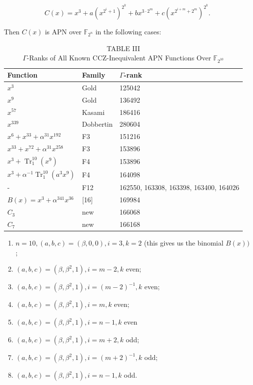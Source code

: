 \documentclass[10pt]{article}
\begin{document}
$$
C(x)=x^{3}+a\left(x^{2^{i}+1}\right)^{2^{k}}+b x^{3 \cdot 2^{m}}+c\left(x^{2^{i+m}+2^{m}}\right)^{2^{k}} .
$$

Then $C(x)$ is APN over $\mathbb{F}_{2^{n}}$ in the following cases:

\begin{table}[h]
\begin{center}
\captionsetup{labelformat=empty}
\caption{TABLE III\\
$\Gamma$-Ranks of All Known CCZ-Inequivalent APN Functions Over $\mathbb{F}_{2^{10}}$}
\begin{tabular}{|l|l|l|}
\hline
Function & Family & $\Gamma$-rank \\
\hline
$x^{3}$ & Gold & 125042 \\
\hline
$x^{9}$ & Gold & 136492 \\
\hline
$x^{57}$ & Kasami & 186416 \\
\hline
$x^{339}$ & Dobbertin & 280604 \\
\hline
$x^{6}+x^{33}+\alpha^{31} x^{192}$ & F3 & 151216 \\
\hline
$x^{33}+x^{72}+\alpha^{31} x^{258}$ & F3 & 153896 \\
\hline
$x^{3}+\operatorname{Tr}_{1}^{10}\left(x^{9}\right)$ & F4 & 153896 \\
\hline
$x^{3}+\alpha^{-1} \operatorname{Tr}_{1}^{10}\left(a^{3} x^{9}\right)$ & F4 & 164098 \\
\hline
- & F12 & 162550, 163308, 163398, 163400, 164026 \\
\hline
$B(x)=x^{3}+\alpha^{341} x^{36}$ & [16] & 169984 \\
\hline
$C_{3}$ & new & 166068 \\
\hline
$C_{7}$ & new & 166168 \\
\hline
\end{tabular}
\end{center}
\end{table}

\begin{enumerate}
  \item $n=10,(a, b, c)=(\beta, 0,0), i=3, k=2$ (this gives us the binomial $B(x))$;
  \item $(a, b, c)=\left(\beta, \beta^{2}, 1\right), i=m-2, k$ even;
  \item $(a, b, c)=\left(\beta, \beta^{2}, 1\right), i=(m-2)^{-1}, k$ even;
  \item $(a, b, c)=\left(\beta, \beta^{2}, 1\right), i=m, k$ even;
  \item $(a, b, c)=\left(\beta, \beta^{2}, 1\right), i=n-1, k$ even
  \item $(a, b, c)=\left(\beta, \beta^{2}, 1\right), i=m+2, k$ odd;
  \item $(a, b, c)=\left(\beta, \beta^{2}, 1\right), i=(m+2)^{-1}, k$ odd;
  \item $(a, b, c)=\left(\beta, \beta^{2}, 1\right), i=n-1, k$ odd.
\end{enumerate}
\end{document}
